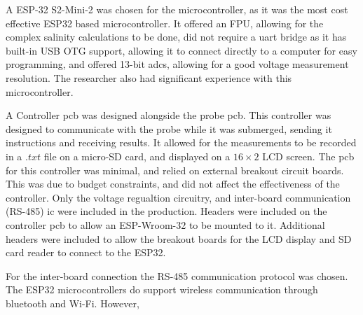 A ESP-32 S2-Mini-2 was chosen for the microcontroller, as it was the most cost effective ESP32 based microcontroller.
It offered an FPU, allowing for the complex salinity calculations to be done, did not require a \gls{uart} bridge as it has built-in USB OTG support, allowing it to connect directly to a computer for easy programming, and offered 13-bit \gls{adc}s, allowing for a good voltage measurement resolution.
The researcher also had significant experience with this microcontroller.

A Controller \gls{pcb} was designed alongside the probe \gls{pcb}.
This controller was designed to communicate with the probe while it was submerged, sending it instructions and receiving results.
It allowed for the measurements to be recorded in a $.txt$ file on a micro-SD card, and displayed on a $16\times2$ LCD screen.
The \gls{pcb} for this controller was minimal, and relied on external breakout circuit boards.
This was due to budget constraints, and did not affect the effectiveness of the controller.
Only the voltage regualtion circuitry, and inter-board communication (RS-485) \gls{ic} were included in the production.
Headers were included on the controller \gls{pcb} to allow an ESP-Wroom-32 to be mounted to it.
Additional headers were included to allow the breakout boards for the LCD display and SD card reader to connect to the ESP32. 

For the inter-board connection the RS-485 communication protocol was chosen.
The ESP32 microcontrollers do support wireless communication through bluetooth and Wi-Fi.
However, 
